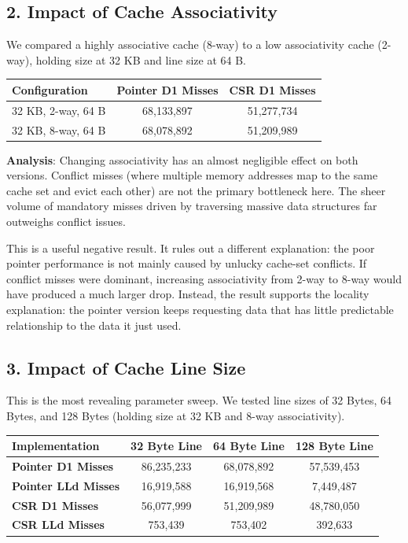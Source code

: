 \documentclass[11pt]{article}
\begin{document}
\subsection{2. Impact of Cache Associativity}
We compared a highly associative cache (8-way) to a low associativity cache (2-way), holding size at 32 KB and line size at 64 B.

\begin{table}[H]
\centering
\begin{tabular}{@{}lcc@{}}
\toprule
\textbf{Configuration} & \textbf{Pointer D1 Misses} & \textbf{CSR D1 Misses} \\ \midrule
32 KB, 2-way, 64 B & 68,133,897 & 51,277,734 \\
32 KB, 8-way, 64 B & 68,078,892 & 51,209,989 \\ \bottomrule
\end{tabular}
\end{table}

\textbf{Analysis}: Changing associativity has an almost negligible effect on both versions. Conflict misses (where multiple memory addresses map to the same cache set and evict each other) are not the primary bottleneck here. The sheer volume of mandatory misses driven by traversing massive data structures far outweighs conflict issues.

This is a useful negative result. It rules out a different explanation: the poor pointer performance is not mainly caused by unlucky cache-set conflicts. If conflict misses were dominant, increasing associativity from 2-way to 8-way would have produced a much larger drop. Instead, the result supports the locality explanation: the pointer version keeps requesting data that has little predictable relationship to the data it just used.

\subsection{3. Impact of Cache Line Size}
This is the most revealing parameter sweep. We tested line sizes of 32 Bytes, 64 Bytes, and 128 Bytes (holding size at 32 KB and 8-way associativity).

\begin{table}[H]
\centering
\begin{tabular}{@{}lccc@{}}
\toprule
\textbf{Implementation} & \textbf{32 Byte Line} & \textbf{64 Byte Line} & \textbf{128 Byte Line} \\ \midrule
\textbf{Pointer D1 Misses} & 86,235,233 & 68,078,892 & 57,539,453 \\
\textbf{Pointer LLd Misses} & 16,919,588 & 16,919,568 & 7,449,487 \\ \midrule
\textbf{CSR D1 Misses} & 56,077,999 & 51,209,989 & 48,780,050 \\
\textbf{CSR LLd Misses} & 753,439 & 753,402 & 392,633 \\ \bottomrule
\end{tabular}
\end{table}
\end{document}
